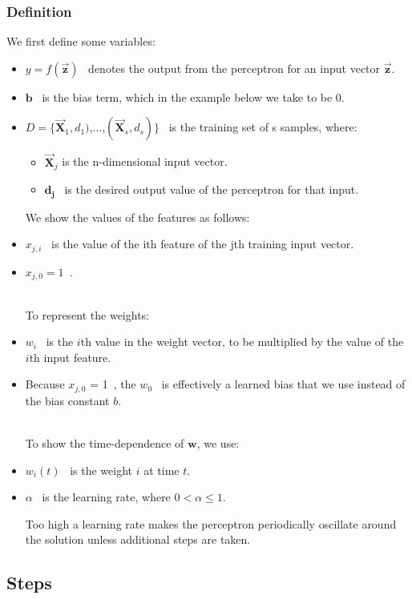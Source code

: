 \subsubsection{Definition}
We first define some variables:
\begin{itemize}
\item $y = f(\vec{\mathbf{z}})$ \, denotes the output from the perceptron for an input vector $\vec{\mathbf{z}}$.
\item $\mathbf{b}$ \, is the bias term, which in the example below we take to be 0.
\item $D = \{\vec{\mathbf{X}}_1,d_1)$,$\dots$,$(\vec{\mathbf{X}}_s,d_s)\}$ \, is the training set of s samples, where:
\begin{itemize}
\item $\vec{\mathbf{X}}_j$ is the n-dimensional input vector.
\item $\mathbf{d_j}$ \, is the desired output value of the perceptron for that input. \hfill \\
\end{itemize}

We show the values of the features as follows:
\item $x_{j,i}$ \, is the value of the ith feature of the jth training input vector.
\item $x_{j,0} = 1$ \,. 

\hfill \\ To represent the weights:
\item $w_i$ \, is the $i$th value in the weight vector, to be multiplied by the value of the $i$th input feature.
\item Because $x_{j,0}$ = 1 \,, the $w_0$ \, is effectively a learned bias that we use instead of the bias constant $b$.

\hfill \\ To show the time-dependence of $\mathbf{w}$, we use:
\item $w_i(t)$ \, is the weight $i$ at time $t$.
\item $\alpha$ \, is the learning rate, where $0 < \alpha \leq 1$.

Too high a learning rate makes the perceptron periodically oscillate around the solution unless additional steps are taken.
\end{itemize}

\subsection{Steps}

